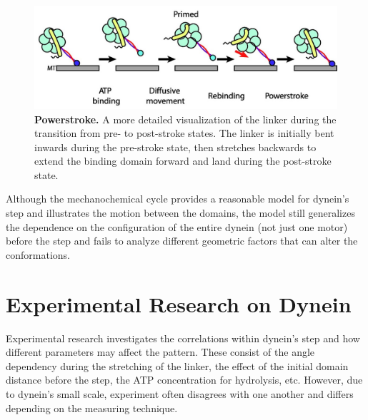 \begin{figure}[H]
	\centering
	\includegraphics[width=1\columnwidth]{Figures/powerstroke.jpeg}
	\caption[Powerstroke]{\textbf{Powerstroke.} A more detailed visualization of the linker during the transition from pre- to post-stroke states. The linker is initially bent inwards during the pre-stroke state, then stretches backwards to extend the binding domain forward and land during the post-stroke state. \cite{Carter2010communication} }
	\label{fig:Powerstroke}
\end{figure}

Although the mechanochemical cycle provides a reasonable model for dynein's step and illustrates the motion between the domains, the model still generalizes the dependence on the configuration of the entire dynein (not just one motor) before the step and fails to analyze different geometric factors that can alter the conformations.

\section{Experimental Research on Dynein}

Experimental research investigates the correlations within dynein's step and how different parameters may affect the pattern. These consist of the angle dependency during the stretching of the linker, the effect of the initial domain distance before the step, the ATP concentration for hydrolysis, etc. However, due to dynein's small scale, experiment often disagrees with one another and differs depending on the measuring technique. 


